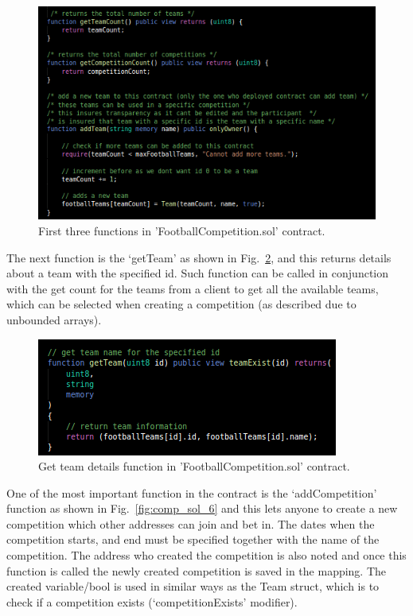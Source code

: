 \begin{figure}[H]
\centering
  \includegraphics[scale = .75]{imgs/comp_sol_4.png}
  \caption{First three functions in 'FootballCompetition.sol' contract.}
  \label{fig:comp_sol_4}
\end{figure}

\noindent
The next function is the ‘getTeam’ as shown in Fig.~\ref{fig:comp_sol_5}, and this returns details about a team with the specified id. Such function can be called in conjunction with the get count for the teams from a client to get all the available teams, which can be selected when creating a competition (as described due to unbounded arrays). 

\begin{figure}[H]
\centering
  \includegraphics[scale = .75]{imgs/comp_sol_5.png}
  \caption{Get team details function in 'FootballCompetition.sol' contract.}
  \label{fig:comp_sol_5}
\end{figure}

\noindent
One of the most important function in the contract is the ‘addCompetition’ function as shown in Fig.~\ref{fig:comp_sol_6} and this lets anyone to create a new competition which other addresses can join and bet in. The dates when the competition starts, and end must be specified together with the name of the competition. The address who created the competition is also noted and once this function is called the newly created competition is saved in the mapping. The created variable/bool is used in similar ways as the Team struct, which is to check if a competition exists (‘competitionExists’ modifier). 

